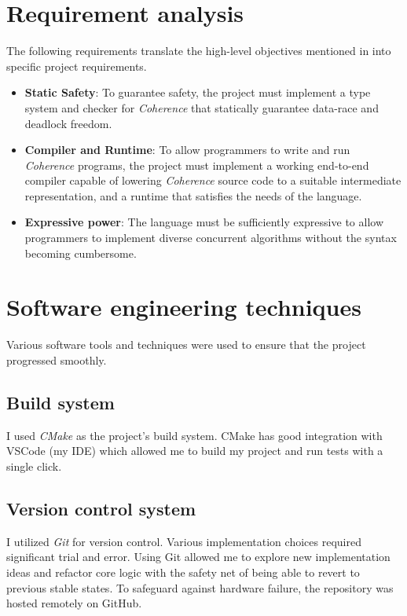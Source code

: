 \section{Requirement analysis} \label{sec:requirement_analysis}
The following requirements translate the high-level objectives mentioned in  into specific project requirements.

\begin{itemize}
    \item \textbf{Static Safety}: To guarantee safety, the project must implement a type system and checker for \textit{Coherence} that statically guarantee data-race and deadlock freedom.
    \item \textbf{Compiler and Runtime}: To allow programmers to write and run \textit{Coherence} programs, the project must implement a working end-to-end compiler capable of lowering \textit{Coherence} source code to a suitable intermediate representation, and a runtime that satisfies the needs of the language.
    \item \textbf{Expressive power}: The language must be sufficiently expressive to allow programmers to implement diverse concurrent algorithms without the syntax becoming cumbersome.
\end{itemize}

\section{Software engineering techniques} \label{sec:software_techniques}
Various software tools and techniques were used to ensure that the project progressed smoothly.

\subsection{Build system}
I used \textit{CMake} as the project's build system. CMake has good integration with VSCode (my IDE) which allowed me to build my project and run tests with a single click.

\subsection{Version control system}
I utilized \textit{Git} for version control. Various implementation choices required significant trial and error. Using Git allowed me to explore new implementation ideas and refactor core logic with the safety net of being able to revert to previous stable states. To safeguard against hardware failure, the repository was hosted remotely on GitHub.

